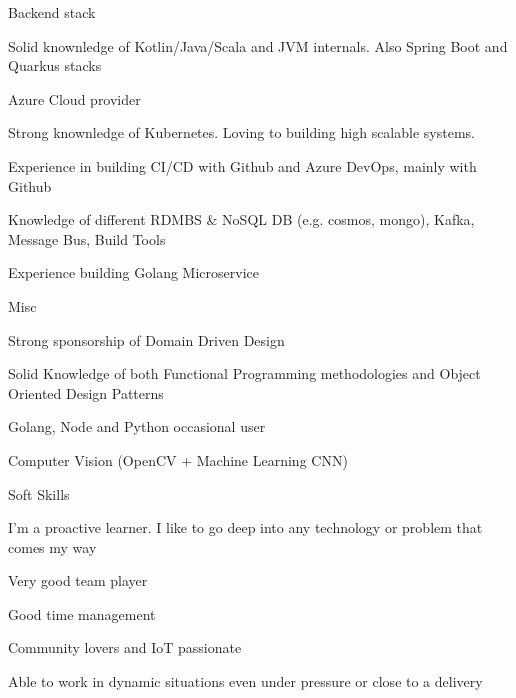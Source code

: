 


\begin{cventries}

\cventry
{Backend stack} %
{} %
{}
{}
{ %
\begin{cvitems}
    \item {Solid knownledge of Kotlin/Java/Scala and JVM internals. Also Spring Boot and Quarkus stacks}
    \item {Azure Cloud provider}
    \item {Strong knownledge of Kubernetes. Loving to building high scalable systems. }
    \item {Experience in building CI/CD with Github and Azure DevOps, mainly with Github}
    \item {Knowledge of different RDMBS \& NoSQL DB (e.g. cosmos, mongo), Kafka, Message Bus, Build Tools }
    \item {Experience building Golang Microservice}
\end{cvitems}
}


\cventry
{Misc} %
{} %
{}
{}
{ %
\begin{cvitems}
    \item {Strong sponsorship of Domain Driven Design}
    \item {Solid Knowledge of both Functional Programming methodologies and Object Oriented Design Patterns}
    \item {Golang, Node and Python occasional user}
    \item {Computer Vision (OpenCV + Machine Learning CNN)}
\end{cvitems}
}


\cventry
{Soft Skills} %
{} %
{}
{}
{ %
\begin{cvitems}
    \item {I'm a proactive learner. I like to go deep into any technology or problem that comes my way }
    \item {Very good team player}
    \item {Good time management}
    \item {Community lovers and IoT passionate}
    \item {Able to work in dynamic situations even under pressure or close to a delivery}
\end{cvitems}
}


\end{cventries}

